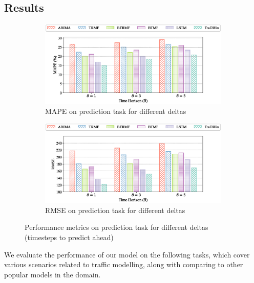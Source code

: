 \subsection{Results}

\begin{figure}[]
  \centering
  \begin{subfigure}[b]{0.9\textwidth}
      \centering
      \includegraphics[width=\textwidth]{mape_pred.eps}
      \caption{MAPE on prediction task for different deltas}
      \label{fig:mape_pred}
  \end{subfigure}
  
  \begin{subfigure}[b]{0.9\textwidth}
      \centering
      \includegraphics[width=\textwidth]{rmse_pred.eps}
      \caption{RMSE on prediction task for different deltas}
      \label{fig:rmse_pred}
  \end{subfigure}
  
  \caption{Performance metrics on prediction task for different deltas (timesteps to predict ahead)}
  \label{fig:pred_metrics}
\end{figure}

We evaluate the performance of our model on the following tasks, which cover various scenarios related to traffic modelling, along with comparing to other popular models in the domain.

